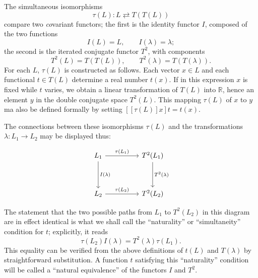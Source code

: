 \documentclass[11pt,a4paper]{report}
\newcommand{\R}{\mathbb{R}}
\begin{document}
The simultaneous isomorphisms
\begin{equation*}
	\tau(L): L\rightleftarrows T(T(L))
\end{equation*}
compare two \textsl{co}variant functors; the first is the identity functor
$I$, composed of the two functions
\begin{equation*}
	I(L)=L,\qquad I(\lambda)=\lambda;
\end{equation*}
the second is the iterated conjugate functor $T^2$, with components
\begin{equation*}
	T^2(L)=T(T(L)),\qquad T^2(\lambda)=T(T(\lambda)).
\end{equation*}
For each $L$, $\tau(L)$ is constructed as follows. Each vector $x\in L$ and
each functional $t\in T(L)$ determine a real number $t(x)$. If in this 
expression $x$ is fixed while $t$ varies, we obtain a linear transformation
of $T(L)$ into $\R$, hence an element $y$ in the double conjugate space
$T^2(L)$. This mapping $\tau(L)$ of $x$ to $y$ ma also be defined formally
by setting $[[\tau(L)]x]t= t(x)$.

The connections between these isomorphisms $\tau(L)$ and the transformations
$\lambda : L_1 \to L_2$ may be displayed thus:
\begin{equation*}
	\begin{tikzpicture}
		\node (a) at (0,0)
		{ \begin{tikzcd}[sep=huge]
		L_1 \arrow[r,"\tau(L_1)"] \arrow[d, "I(\lambda)"] & T^2(L_1) 
		\arrow[d,"T^2(\lambda)"] \\
		L_2 \arrow[r,"\tau(L_2)"] & T^2(L_2)
		\end{tikzcd}};
	\end{tikzpicture}
\end{equation*}
The statement that the two possible paths from $L_1$ to $T^2(L_2)$ in this
diagram are in effect identical is what we shall call the ``naturality''
or ``simultaneity'' condition for $t$; explicitly, it reads
\begin{equation}\label{eq:nat1}
	\tau(L_2)I(\lambda)=T^2(\lambda)\tau(L_1).
\end{equation}
This equality can be verified from the above definitions of $t(L)$ and
$T(\lambda)$ by straightforward substitution. A function $t$ satisfying this
``naturality'' condition will be called a ``natural equivalence'' of the
functors $I$ and $T^2$.
\end{document}

